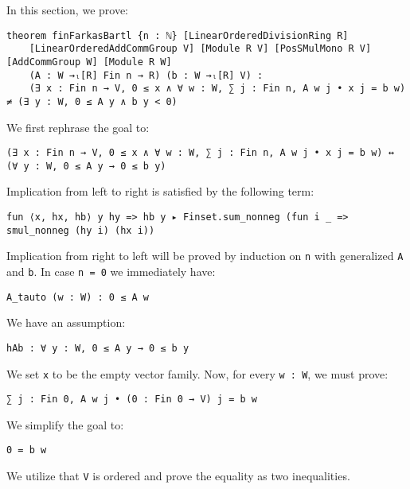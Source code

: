 \documentclass[]{article}
\renewcommand{\.}{\hskip .75pt}
\begin{document}
	


\noindent In this section, we prove:
\begin{lstlisting}
theorem finFarkasBartl {n : ℕ} [LinearOrderedDivisionRing R]
    [LinearOrderedAddCommGroup V] [Module R V] [PosSMulMono R V] [AddCommGroup W] [Module R W]
    (A : W →ₗ[R] Fin n → R) (b : W →ₗ[R] V) :
    (∃ x : Fin n → V, 0 ≤ x ∧ ∀ w : W, ∑ j : Fin n, A w j • x j = b w) ≠ (∃ y : W, 0 ≤ A y ∧ b y < 0)
\end{lstlisting}
We first rephrase the goal to:
\begin{lstlisting}
(∃ x : Fin n → V, 0 ≤ x ∧ ∀ w : W, ∑ j : Fin n, A w j • x j = b w) ↔ (∀ y : W, 0 ≤ A y → 0 ≤ b y)
\end{lstlisting}
Implication from left to right is satisfied by the following term:
\begin{lstlisting}
fun ⟨x, hx, hb⟩ y hy => hb y ▸ Finset.sum_nonneg (fun i _ => smul_nonneg (hy i) (hx i))
\end{lstlisting}
Implication from right to left will be proved by induction on \texttt{n} with generalized \texttt{A} and \texttt{b}.
In case \texttt{n = 0} we immediately have:
\begin{lstlisting}
A_tauto (w : W) : 0 ≤ A w
\end{lstlisting}
We have an assumption:
\begin{lstlisting}
hAb : ∀ y : W, 0 ≤ A y → 0 ≤ b y
\end{lstlisting}
We set \texttt{x} to be the empty vector family. Now, for every \texttt{w :~W}, we must prove:
\begin{lstlisting}
∑ j : Fin 0, A w j • (0 : Fin 0 → V) j = b w
\end{lstlisting}
We simplify the goal to:
\begin{lstlisting}
0 = b w
\end{lstlisting}
We utilize that \texttt{V} is ordered and prove the equality as two inequalities.
\end{document}

